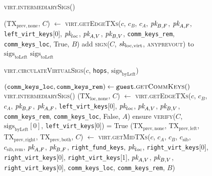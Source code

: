 \begin{figure}[H]
\begin{processbox}{\textsc{virt.intermediarySigs}()}
\begin{algorithmic}[1]
        \State ($\mathrm{TX}_{\mathrm{prev}, \mathrm{none}}$, $C$) $\gets$
        \textsc{virt.getEdgeTXs}($c$, $c_B$, $c_A$, $\textit{pk}_{B, F}$, $\textit{pk}_{A, F}$,
        \texttt{left\_virt\_keys}[0], $\textit{pk}_{loc}$,  $\textit{pk}_{A, V}$, $\textit{pk}_{B, V}$,
        \texttt{comm\_keys\_rem}, \texttt{comm\_keys\_loc}, True, $B$)
        \State add \textsc{sign}($C$, $\textit{sk}_{\mathrm{loc}, \mathrm{virt}}$,
        \textsc{anyprevout}) to $\mathrm{sigs}_{\mathrm{toLeft}}$
      \EndIf
      \State \Return $\mathrm{sigs}_{\mathrm{toLeft}}$
    \end{algorithmic}
  \end{processbox}
  \caption{}
  \label{code:virtual-layer:intermediary-sigs}
\end{figure}

\begin{figure}[H]
  \begin{processbox}{\textsc{virt.circulateVirtualSigs}($c$, \texttt{hops},
  $\mathrm{sigs}_{\mathrm{byLeft}}$)}
    \begin{algorithmic}[1]
      \State $(\texttt{comm\_keys\_loc}, \texttt{comm\_keys\_rem}) \gets
      \texttt{guest}.\textsc{getCommKeys}()$
       
         
          \State \Return \textsc{virt.intermediarySigs}()
        \Else \: 
          \State ($\mathrm{TX}_{\mathrm{loc}, \mathrm{none}}$, $C$) $\gets$
          \textsc{virt.getEdgeTXs}($c$, $c_B$, $c_A$, $\textit{pk}_{B, F}$, $\textit{pk}_{A, F}$,
          \texttt{left\_virt\_keys}[0], $\textit{pk}_{loc}$, $\textit{pk}_{A, V}$, $\textit{pk}_{B, V}$,
          \texttt{comm\_keys\_rem}, \texttt{comm\_keys\_loc}, False, $A$)
          \State ensure \textsc{verify}($C$,
          $\mathrm{sigs}_{\mathrm{byLeft}}[0]$, \texttt{left\_virt\_keys}[0]) =
          True
          \State ($\mathrm{TX}_{\mathrm{prev}, \mathrm{none}}$,
          $\mathrm{TX}_{\mathrm{prev}, \mathrm{left}}$,
          $\mathrm{TX}_{\mathrm{prev}, \mathrm{right}}$,
          $\mathrm{TX}_{\mathrm{prev}, \mathrm{both}}$, $C$) $\gets$
          \textsc{virt.getMidTXs}($c$, $c_A$, $c_B$, $c_{\mathrm{sib}}$,
          $c_{\mathrm{sib}, \mathrm{rem}}$, $\textit{pk}_{A, F}$, $\textit{pk}_{B, F}$,
          \texttt{right\_fund\_keys}, $\textit{pk}_{loc}$, \texttt{right\_virt\_keys}[0],
          \texttt{right\_virt\_keys}[0], \texttt{right\_virt\_keys}[1], $\textit{pk}_{A,
          V}$, $\textit{pk}_{B, V}$, \texttt{right\_virt\_keys}[0],
          \texttt{comm\_keys\_loc}, \texttt{comm\_keys\_rem}, $B$)

\end{algorithmic}
\end{processbox}
\end{figure}
